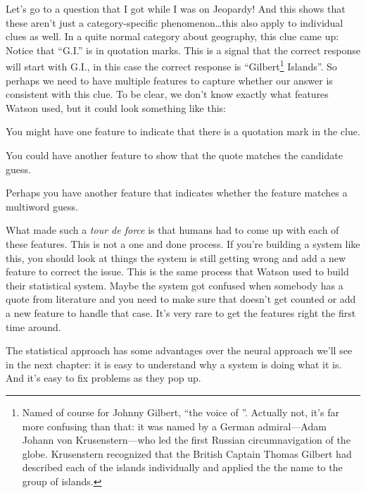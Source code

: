 Let’s go to a question that I got while I was on Jeopardy!  And this shows
that these aren’t just a category-specific phenomenon\dots this
also apply to individual clues as well.  In a quite normal category about
geography, this clue came up:
Notice that ``G.I.'' is in quotation marks.  This is a signal that the correct response will start with G.I., in this case the correct response is ``Gilbert\footnote{Named of course for Johnny Gilbert, ``the voice of \jeopardy{}''.  Actually not, it’s far more confusing than that: it was named by a German admiral---Adam Johann von Krusenstern---who led the first Russian circumnavigation of the globe.  Krusenstern recognized that the British Captain Thomas Gilbert had described each of the islands individually and applied the the name to the group of islands.}
Islands''.
%
So perhaps we need to have multiple features to capture whether our answer is
consistent with this clue.
%
To be clear, we don’t know exactly what features Watson used, but it could
look something like this:
\begin{itemize*}
  \item You might have one feature to indicate that there is a quotation mark
    in the clue.
    \item You could have another feature to show that the quote matches the
      candidate guess.
      \item Perhaps you have another feature that indicates whether the
        feature matches a multiword guess.
\end{itemize*}

What made \watson{} such a \textit{tour de force} is that humans had to come
up with each of these features.
%
This is not a one and done process.  If you're building a system like
this, you should look at things the system is still getting wrong and
add a new feature to correct the issue.  This is the same process that
Watson used to build their statistical system.  Maybe the system got
confused when somebody has a quote from literature and you need to
make sure that doesn’t get counted or add a new feature to handle that
case.  It’s very rare to get the features right the first time around.



The statistical approach has some advantages over the neural approach
we'll see in the next chapter: it is easy to understand why a system
is doing what it is.  And it's easy to fix problems as they pop up.



